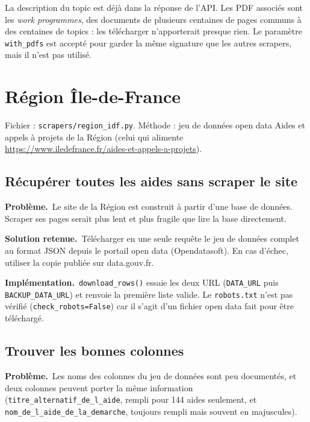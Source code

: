\documentclass[11pt,a4paper]{article}
\newcommand{\pb}{\par\medskip\noindent\textbf{\textcolor{pbcolor}{Problème.}}\ }
\newcommand{\sol}{\par\medskip\noindent\textbf{\textcolor{solcolor}{Solution retenue.}}\ }
\newcommand{\impl}{\par\medskip\noindent\textbf{\textcolor{implcolor}{Implémentation.}}\ }
\newcommand{\code}[1]{\texttt{#1}}
\begin{document}
La description du topic est déjà dans la réponse de l'API. Les PDF associés sont les
\emph{work programmes}, des documents de plusieurs centaines de pages communs à des
centaines de topics : les télécharger n'apporterait presque rien. Le paramètre
\code{with\_pdfs} est accepté pour garder la même signature que les autres scrapers,
mais il n'est pas utilisé.

\section{Région Île-de-France}
\label{sec:region}

Fichier : \code{scrapers/region\_idf.py}. Méthode : jeu de données open data
\og Aides et appels à projets de la Région \fg{} (celui qui alimente
\url{https://www.iledefrance.fr/aides-et-appels-a-projets}).

\subsection{Récupérer toutes les aides sans scraper le site}

\pb Le site de la Région est construit à partir d'une base de données. Scraper ses pages
serait plus lent et plus fragile que lire la base directement.

\sol Télécharger en une seule requête le jeu de données complet au format JSON depuis le
portail open data (Opendatasoft). En cas d'échec, utiliser la copie publiée sur
data.gouv.fr.

\impl \code{download\_rows()} essaie les deux URL (\code{DATA\_URL} puis
\code{BACKUP\_DATA\_URL}) et renvoie la première liste valide. Le \code{robots.txt} n'est
pas vérifié (\code{check\_robots=False}) car il s'agit d'un fichier open data fait pour être
téléchargé.

\subsection{Trouver les bonnes colonnes}

\pb Les noms des colonnes du jeu de données sont peu documentés, et deux colonnes peuvent
porter la même information (\code{titre\_alternatif\_de\_l\_aide}, rempli pour 144 aides
seulement, et \code{nom\_de\_l\_aide\_de\_la\_demarche}, toujours rempli mais souvent en
majuscules).
\end{document}
